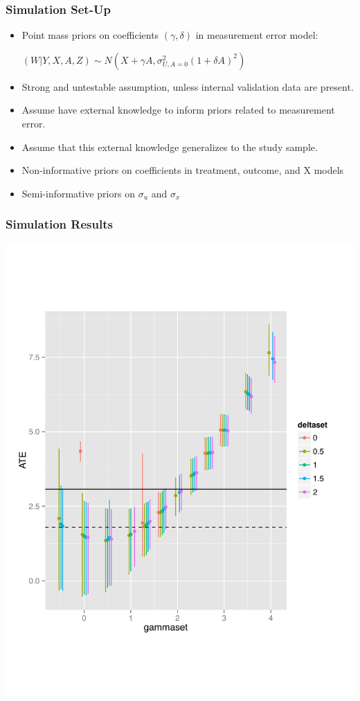 \documentclass{beamer}
\begin{document}
\begin{frame}

\frametitle{ Simulation Set-Up}

\begin{itemize}
\item Point mass priors on coefficients $(\gamma, \delta)$ in measurement error model:

$(W \vert Y, X, A, Z) \sim N(X + \gamma A, \sigma^2_{U,A=0}(1 + \delta A)^2)$

\item Strong and untestable assumption, unless internal validation data are present. 
\item Assume have external knowledge to inform priors related to measurement error.
\item Assume that this external knowledge generalizes to the study sample.
\item Non-informative priors on coefficients in treatment, outcome, and X models
\item Semi-informative priors on $\sigma_u$ and $\sigma_x$
\end{itemize}
 

\end{frame} 

\begin{frame}

\frametitle{ Simulation Results}
\centering
\includegraphics[width=\textwidth,height=0.9\textheight,keepaspectratio]{BayesianMESummary-007}

 

\end{frame} 
\end{document}
